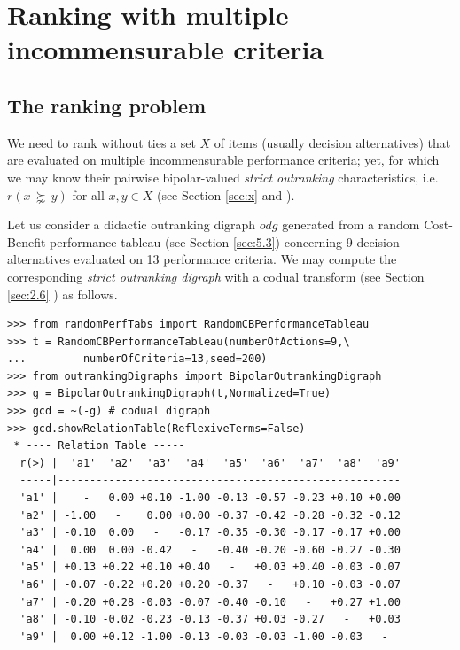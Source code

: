 \chapter{Ranking with multiple incommensurable criteria}
\label{sec:8}



\section{The ranking problem}
\label{sec:8.1}

We need to rank without ties a set $X$ of items (usually decision alternatives) that are evaluated on multiple incommensurable performance criteria; yet, for which we may know their pairwise bipolar-valued {\em strict outranking\/} characteristics, i.e. $r(x\, \succnsim \, y)$ for all $x, y \in X$ (see Section \ref{sec:x} and \citep{BIS-2013}).

Let us consider a didactic outranking digraph $odg$ generated from a random Cost-Benefit performance tableau (see Section \ref{sec:5.3}) concerning 9 decision alternatives evaluated on 13 performance criteria. We may compute the corresponding {\em strict outranking digraph\/} with a codual transform (see Section \ref{sec:2.6} ) as follows.

\begin{lstlisting}[caption={Random bipolar-valued strict outranking relation characteristics},label=list:8.1]
>>> from randomPerfTabs import RandomCBPerformanceTableau   
>>> t = RandomCBPerformanceTableau(numberOfActions=9,\
...         numberOfCriteria=13,seed=200)
>>> from outrankingDigraphs import BipolarOutrankingDigraph
>>> g = BipolarOutrankingDigraph(t,Normalized=True)
>>> gcd = ~(-g) # codual digraph
>>> gcd.showRelationTable(ReflexiveTerms=False)
 * ---- Relation Table -----
  r(>) |  'a1'  'a2'  'a3'  'a4'  'a5'  'a6'  'a7'  'a8'  'a9'   
  -----|------------------------------------------------------
  'a1' |    -   0.00 +0.10 -1.00 -0.13 -0.57 -0.23 +0.10 +0.00  
  'a2' | -1.00   -    0.00 +0.00 -0.37 -0.42 -0.28 -0.32 -0.12  
  'a3' | -0.10  0.00   -   -0.17 -0.35 -0.30 -0.17 -0.17 +0.00  
  'a4' |  0.00  0.00 -0.42   -   -0.40 -0.20 -0.60 -0.27 -0.30  
  'a5' | +0.13 +0.22 +0.10 +0.40   -   +0.03 +0.40 -0.03 -0.07  
  'a6' | -0.07 -0.22 +0.20 +0.20 -0.37   -   +0.10 -0.03 -0.07  
  'a7' | -0.20 +0.28 -0.03 -0.07 -0.40 -0.10   -   +0.27 +1.00  
  'a8' | -0.10 -0.02 -0.23 -0.13 -0.37 +0.03 -0.27   -   +0.03  
  'a9' |  0.00 +0.12 -1.00 -0.13 -0.03 -0.03 -1.00 -0.03   -   
\end{lstlisting}
  
